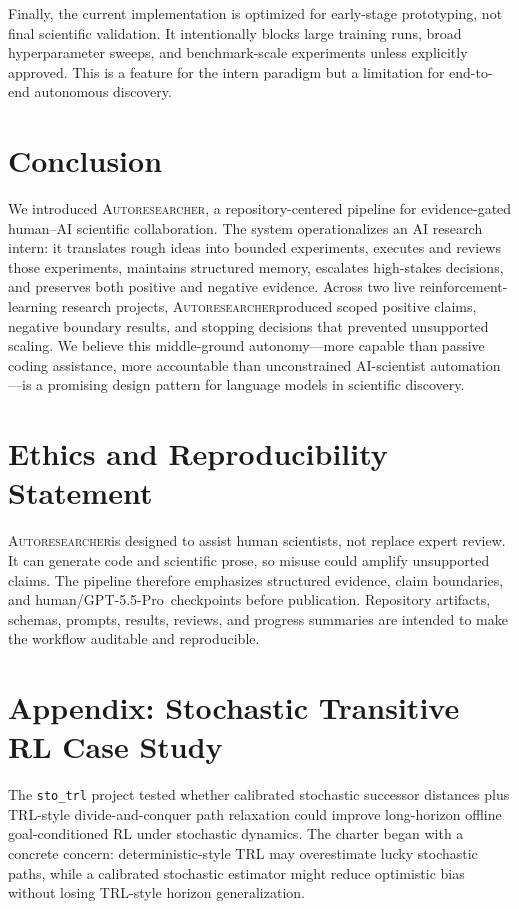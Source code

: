 \documentclass{article}
\newcommand{\sys}{\textsc{Autoresearcher}}
\newcommand{\gptpro}{GPT-5.5-Pro}
\begin{document}
Finally, the current implementation is optimized for early-stage prototyping, not final scientific validation. It intentionally blocks large training runs, broad hyperparameter sweeps, and benchmark-scale experiments unless explicitly approved. This is a feature for the intern paradigm but a limitation for end-to-end autonomous discovery.

\section{Conclusion}

We introduced \sys, a repository-centered pipeline for evidence-gated human--AI scientific collaboration. The system operationalizes an AI research intern: it translates rough ideas into bounded experiments, executes and reviews those experiments, maintains structured memory, escalates high-stakes decisions, and preserves both positive and negative evidence. Across two live reinforcement-learning research projects, \sys produced scoped positive claims, negative boundary results, and stopping decisions that prevented unsupported scaling. We believe this middle-ground autonomy---more capable than passive coding assistance, more accountable than unconstrained AI-scientist automation---is a promising design pattern for language models in scientific discovery.

\section*{Ethics and Reproducibility Statement}

\sys is designed to assist human scientists, not replace expert review. It can generate code and scientific prose, so misuse could amplify unsupported claims. The pipeline therefore emphasizes structured evidence, claim boundaries, and human/\gptpro\ checkpoints before publication. Repository artifacts, schemas, prompts, results, reviews, and progress summaries are intended to make the workflow auditable and reproducible.




\newpage
\appendix

\section{Appendix: Stochastic Transitive RL Case Study}
\label{app:stotrl}

The \texttt{sto\_trl} project tested whether calibrated stochastic successor distances plus TRL-style divide-and-conquer path relaxation could improve long-horizon offline goal-conditioned RL under stochastic dynamics. The charter began with a concrete concern: deterministic-style TRL may overestimate lucky stochastic paths, while a calibrated stochastic estimator might reduce optimistic bias without losing TRL-style horizon generalization.
\end{document}
